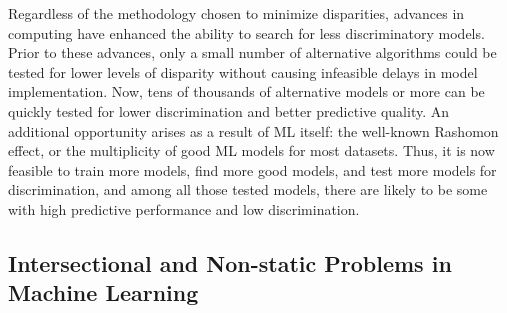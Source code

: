 \documentclass[information,article,submit,moreauthors,pdftex]{definitions/mdpi}
\begin{document}
Regardless of the methodology chosen to minimize disparities, advances in computing have enhanced the ability to search for less discriminatory models.  Prior to these advances, only a small number of alternative algorithms could be tested for lower levels of disparity without causing infeasible delays in model implementation.  Now, tens of thousands of alternative models or more can be quickly tested for lower discrimination and better predictive quality.  An additional opportunity arises as a result of ML itself: the well-known Rashomon effect, or the multiplicity of good ML models for most datasets. Thus, it is now feasible to train more models, find more good models, and test more models for discrimination, and among all those tested models, there are likely to be some with high predictive performance and low discrimination.

\subsection{Intersectional and Non-static Problems in Machine Learning}
\end{document}
